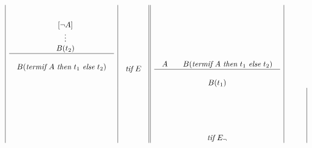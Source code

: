\[\begin{array}{|c|c||c|c|}
\begin{array}{cc}
\ \ \ 
\begin{array}{c}
{[\neg A]}\\
\vdots\\
B(t_2)
\end{array}
\\
\hline\\
\begin{array}{c}
B(\mbox{{\em termif}} \ A \ \mbox{{\em then}} \ t_1 \ \mbox{{\em else}} \ t_2)
\end{array}
\end{array}
&
\begin{array}{l}
\\ \\ \\ \\ \\
\mbox{{\em tif}} \  E
\end{array}
&
\begin{array}{cc}
\\ \\
\begin{array}{c}
\\ \\ \\ \\
A
\end{array}
\ \ \ 
\begin{array}{c}
\\ \\ \\ \\
B(\mbox{{\em termif}} \ A \ \mbox{{\em then}} \ t_1 \ \mbox{{\em else}} \ t_2)
\end{array}
\\
\hline\\
\begin{array}{c}
B(t_1)
\end{array}
\end{array}
\\ %
& &
\begin{array}{l}
\\ \\ \\ \\ \\
\mbox{{\em tif}} \  E_{\neg}
\end{array}
&
\begin{array}{cc}
\\ \\
\begin{array}{c}
\\ \\ \\ \\

\end{array}
\end{array}
\end{array}\]
